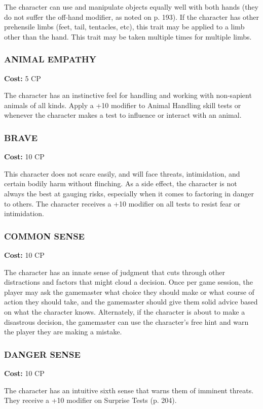 The character can use and manipulate objects equally well with both hands (they
do not suffer the off-hand modifier, as noted on p. 193). If the character
has other prehensile limbs (feet, tail, tentacles, etc), this trait may be
applied to a limb other than the hand. This trait may be taken multiple times
for multiple limbs.

\subsubsection{ANIMAL EMPATHY}
\textbf{Cost:} 5 CP

The character has an instinctive feel for handling and working with non-sapient
animals of all kinds.  Apply a +10 modifier to Animal Handling skill tests or
whenever the character makes a test to influence or interact with an animal.

\subsubsection{BRAVE}
\textbf{Cost:} 10 CP

This character does not scare easily, and will face threats, intimidation, and
certain bodily harm without flinching. As a side effect, the character is not
always the best at gauging risks, especially when it comes to factoring in
danger to others. The character receives a +10 modifier on all tests to
resist fear or intimidation.

\subsubsection{COMMON SENSE}
\textbf{Cost:} 10 CP

The character has an innate sense of judgment that cuts through other
distractions and factors that might cloud a decision. Once per game session,
the player may ask the gamemaster what choice they should make or what course
of action they should take, and the gamemaster should give them solid advice
based on what the character knows. Alternately, if the character is about to
make a disastrous decision, the gamemaster can use the character’s free hint
and warn the player they are making a mistake.

\subsubsection{DANGER SENSE}
\textbf{Cost:} 10 CP

The character has an intuitive sixth sense that warns them of imminent
threats. They receive a +10 modifier on Surprise Tests (p. 204).


